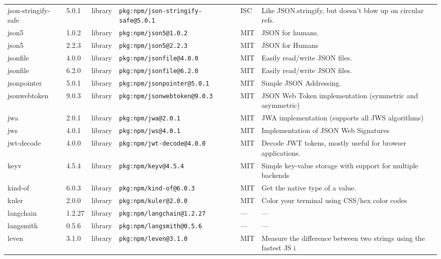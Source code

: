 \documentclass[11pt,a4paper]{article}
\begin{document}
\begin{longtable}{|p{4cm}|p{2cm}|p{1.6cm}|p{5cm}|p{1.5cm}|p{3.5cm}|}
\raggedright json-stringify-safe & 5.0.1 & library & \small\texttt{pkg:npm/json-stringify-safe@5.0.1} & ISC & \small Like JSON.stringify, but doesn't blow up on circular refs. \\
\raggedright json5 & 1.0.2 & library & \small\texttt{pkg:npm/json5@1.0.2} & MIT & \small JSON for humans. \\
\raggedright json5 & 2.2.3 & library & \small\texttt{pkg:npm/json5@2.2.3} & MIT & \small JSON for Humans \\
\raggedright jsonfile & 4.0.0 & library & \small\texttt{pkg:npm/jsonfile@4.0.0} & MIT & \small Easily read/write JSON files. \\
\raggedright jsonfile & 6.2.0 & library & \small\texttt{pkg:npm/jsonfile@6.2.0} & MIT & \small Easily read/write JSON files. \\
\raggedright jsonpointer & 5.0.1 & library & \small\texttt{pkg:npm/jsonpointer@5.0.1} & MIT & \small Simple JSON Addressing. \\
\raggedright jsonwebtoken & 9.0.3 & library & \small\texttt{pkg:npm/jsonwebtoken@9.0.3} & MIT & \small JSON Web Token implementation (symmetric and asymmetric) \\
\raggedright jwa & 2.0.1 & library & \small\texttt{pkg:npm/jwa@2.0.1} & MIT & \small JWA implementation (supports all JWS algorithms) \\
\raggedright jws & 4.0.1 & library & \small\texttt{pkg:npm/jws@4.0.1} & MIT & \small Implementation of JSON Web Signatures \\
\raggedright jwt-decode & 4.0.0 & library & \small\texttt{pkg:npm/jwt-decode@4.0.0} & MIT & \small Decode JWT tokens, mostly useful for browser applications. \\
\raggedright keyv & 4.5.4 & library & \small\texttt{pkg:npm/keyv@4.5.4} & MIT & \small Simple key-value storage with support for multiple backends \\
\raggedright kind-of & 6.0.3 & library & \small\texttt{pkg:npm/kind-of@6.0.3} & MIT & \small Get the native type of a value. \\
\raggedright kuler & 2.0.0 & library & \small\texttt{pkg:npm/kuler@2.0.0} & MIT & \small Color your terminal using CSS/hex color codes \\
\raggedright langchain & 1.2.27 & library & \small\texttt{pkg:npm/langchain@1.2.27} & — & \small — \\
\raggedright langsmith & 0.5.6 & library & \small\texttt{pkg:npm/langsmith@0.5.6} & — & \small — \\
\raggedright leven & 3.1.0 & library & \small\texttt{pkg:npm/leven@3.1.0} & MIT & \small Measure the difference between two strings using the fastest JS i \\

\end{longtable}
\end{document}
